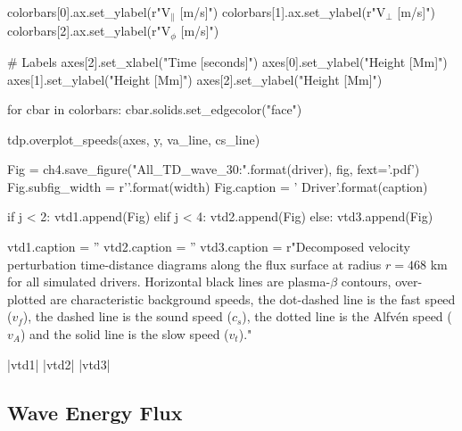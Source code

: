 \begin{pycode}[chapter4]
    colorbars[0].ax.set_ylabel(r"V$_\parallel$ [m/s]")
    colorbars[1].ax.set_ylabel(r"V$_\perp$ [m/s]")
    colorbars[2].ax.set_ylabel(r"V$_\phi$ [m/s]")
    
    # Labels
    axes[2].set_xlabel("Time [seconds]")
    axes[0].set_ylabel("Height [Mm]")
    axes[1].set_ylabel("Height [Mm]")
    axes[2].set_ylabel("Height [Mm]")
    
    for cbar in colorbars:
        cbar.solids.set_edgecolor("face")

    tdp.overplot_speeds(axes, y, va_line, cs_line)
    
    Fig = ch4.save_figure("All_TD_wave_30:{}".format(driver), fig, fext='.pdf')
    Fig.subfig_width = r'{}\columnwidth'.format(width)
    Fig.caption = '{} Driver'.format(caption)
    
    if j < 2:
        vtd1.append(Fig)
    elif j < 4:
        vtd2.append(Fig)
    else:
        vtd3.append(Fig)
        

vtd1.caption = ''
vtd2.caption = ''
vtd3.caption = r"Decomposed velocity perturbation time-distance diagrams along the flux surface at radius $r = 468$ km for all simulated drivers. Horizontal black lines are plasma-$\beta$ contours, over-plotted are characteristic background speeds, the dot-dashed line is the fast speed ($v_f$), the dashed line is the sound speed ($c_s$), the dotted line is the Alfv\'en speed ($v_A$) and the solid line is the slow speed ($v_t$)."
\end{pycode}

\py[chapter4]|vtd1|
\py[chapter4]|vtd2|
\py[chapter4]|vtd3|

\subsection{Wave Energy Flux}\label{sec:energy_flux}

